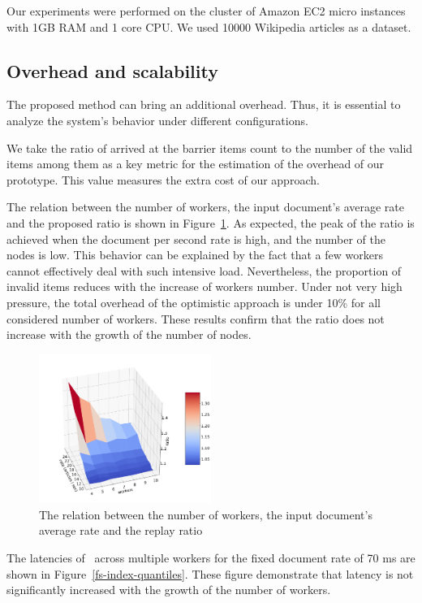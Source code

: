 Our experiments were performed on the cluster of Amazon EC2 micro instances with 1GB RAM and 1 core CPU. We used 10000 Wikipedia articles as a dataset. 

\subsection{Overhead and scalability}
The proposed method can bring an additional overhead. Thus, it is essential to analyze the system's behavior under different configurations.

We take the ratio of arrived at the barrier items count to the number of the valid items among them as a key metric for the estimation of the overhead of our prototype. This value measures the extra cost of our approach.

The relation between the number of workers, the input document's average rate and the proposed ratio is shown in Figure~\ref{overhead}. As expected, the peak of the ratio is achieved when the document per second rate is high, and the number of the nodes is low. This behavior can be explained by the fact that a few workers cannot effectively deal with such intensive load. Nevertheless, the proportion of invalid items reduces with the increase of workers number. Under not very high pressure, the total overhead of the optimistic approach is under 10\% for all considered number of workers. These results confirm that the ratio does not increase with the growth of the number of nodes.

\begin{figure}[htbp]
  \centering
  \includegraphics[width=0.5\textwidth]{pics/overhead}
  \caption{The relation between the number of workers, the input document's average rate and the replay ratio}
  \label {overhead}
\end{figure}

The latencies of \FlameStream\ across multiple workers for the fixed document rate of 70 ms are shown in Figure~\ref{fs-index-quantiles}. These figure demonstrate that latency is not significantly increased with the growth of the number of workers. 

